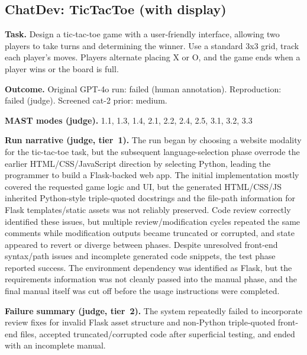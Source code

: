 \subsection*{ChatDev: TicTacToe (with display)}
\textbf{Task.} Design a tic-tac-toe game with a user-friendly interface, allowing two players to take turns and determining the winner. Use a standard 3x3 grid, track each player's moves. Players alternate placing X or O, and the game ends when a player wins or the board is full.

\textbf{Outcome.} Original GPT-4o run: failed (human annotation). Reproduction: failed (judge). Screened cat-2 prior: medium.

\textbf{MAST modes (judge).} 1.1, 1.3, 1.4, 2.1, 2.2, 2.4, 2.5, 3.1, 3.2, 3.3

\textbf{Run narrative (judge, tier~1).} The run began by choosing a website modality for the tic-tac-toe task, but the subsequent language-selection phase overrode the earlier HTML/CSS/JavaScript direction by selecting Python, leading the programmer to build a Flask-backed web app. The initial implementation mostly covered the requested game logic and UI, but the generated HTML/CSS/JS inherited Python-style triple-quoted docstrings and the file-path information for Flask templates/static assets was not reliably preserved. Code review correctly identified these issues, but multiple review/modification cycles repeated the same comments while modification outputs became truncated or corrupted, and state appeared to revert or diverge between phases. Despite unresolved front-end syntax/path issues and incomplete generated code snippets, the test phase reported success. The environment dependency was identified as Flask, but the requirements information was not cleanly passed into the manual phase, and the final manual itself was cut off before the usage instructions were completed.

\textbf{Failure summary (judge, tier~2).} The system repeatedly failed to incorporate review fixes for invalid Flask asset structure and non-Python triple-quoted front-end files, accepted truncated/corrupted code after superficial testing, and ended with an incomplete manual.

